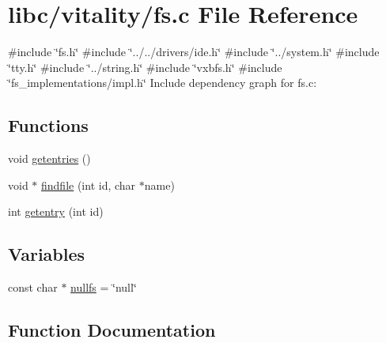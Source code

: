 \hypertarget{a00149}{}\section{libc/vitality/fs.c File Reference}
\label{a00149}
{\ttfamily \#include \char`\"{}fs.\+h\char`\"{}}\newline
{\ttfamily \#include \char`\"{}../../drivers/ide.\+h\char`\"{}}\newline
{\ttfamily \#include \char`\"{}../system.\+h\char`\"{}}\newline
{\ttfamily \#include \char`\"{}tty.\+h\char`\"{}}\newline
{\ttfamily \#include \char`\"{}../string.\+h\char`\"{}}\newline
{\ttfamily \#include \char`\"{}vxbfs.\+h\char`\"{}}\newline
{\ttfamily \#include \char`\"{}fs\+\_\+implementations/impl.\+h\char`\"{}}\newline
Include dependency graph for fs.\+c\+:
\subsection*{Functions}
\begin{DoxyCompactItemize}
\item 
void \hyperlink{a00149_a414110036132977c34813673360e1a63_a414110036132977c34813673360e1a63}{getentries} ()
\item 
void $\ast$ \hyperlink{a00149_a89d79ab10f0c468a6c0d8403ddf50092_a89d79ab10f0c468a6c0d8403ddf50092}{findfile} (int id, char $\ast$name)
\item 
int \hyperlink{a00149_a3fb32d07d3bd05144a196c94fc59c0d1_a3fb32d07d3bd05144a196c94fc59c0d1}{getentry} (int id)
\end{DoxyCompactItemize}
\subsection*{Variables}
\begin{DoxyCompactItemize}
\item 
const char $\ast$ \hyperlink{a00149_a36265ac74fd925405e1179e799961f1e_a36265ac74fd925405e1179e799961f1e}{nullfs} = \char`\"{}null\char`\"{}
\end{DoxyCompactItemize}


\subsection{Function Documentation}
\mbox{\label{a00149_a89d79ab10f0c468a6c0d8403ddf50092_a89d79ab10f0c468a6c0d8403ddf50092}} 
